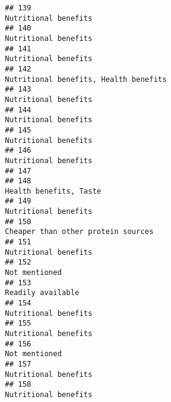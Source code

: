 \documentclass[
]{article}
\begin{document}
\begin{verbatim}
## 139                                                                                                       Nutritional benefits
## 140                                                                                                       Nutritional benefits
## 141                                                                                                       Nutritional benefits
## 142                                                                                      Nutritional benefits, Health benefits
## 143                                                                                                       Nutritional benefits
## 144                                                                                                       Nutritional benefits
## 145                                                                                                       Nutritional benefits
## 146                                                                                                       Nutritional benefits
## 147                                                                                                                           
## 148                                                                                                     Health benefits, Taste
## 149                                                                                                       Nutritional benefits
## 150                                                                                         Cheaper than other protein sources
## 151                                                                                                       Nutritional benefits
## 152                                                                                                             Not mentioned 
## 153                                                                                                          Readily available
## 154                                                                                                       Nutritional benefits
## 155                                                                                                       Nutritional benefits
## 156                                                                                                              Not mentioned
## 157                                                                                                       Nutritional benefits
## 158                                                                                                       Nutritional benefits

\end{verbatim}
\end{document}
